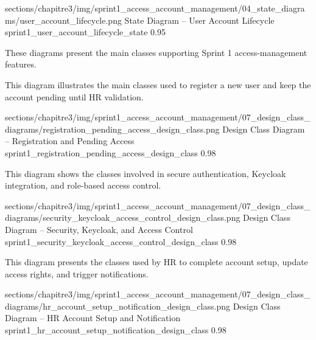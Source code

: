 \ChapterThreeFigureSized
{sections/chapitre3/img/sprint1_access_account_management/04_state_diagrams/user_account_lifecycle.png}
{State Diagram – User Account Lifecycle}
{sprint1_user_account_lifecycle_state}
{0.95}


{\fontsize{12}{18}\selectfont
\setlength{\parindent}{1.2cm}
\setlength{\parskip}{6pt}

\indent These diagrams present the main classes supporting Sprint 1 access-management features.
}

\Needspace{9.5cm}

\noindent This diagram illustrates the main classes used to register a new user and keep the account pending until HR validation.\par

\ChapterThreeFigureSized
{sections/chapitre3/img/sprint1_access_account_management/07_design_class_diagrams/registration_pending_access_design_class.png}
{Design Class Diagram – Registration and Pending Access}
{sprint1_registration_pending_access_design_class}
{0.98}

\Needspace{9.5cm}

\noindent This diagram shows the classes involved in secure authentication, Keycloak integration, and role-based access control.\par

\ChapterThreeFigureSized
{sections/chapitre3/img/sprint1_access_account_management/07_design_class_diagrams/security_keycloak_access_control_design_class.png}
{Design Class Diagram – Security, Keycloak, and Access Control}
{sprint1_security_keycloak_access_control_design_class}
{0.98}

\Needspace{9.5cm}

\noindent This diagram presents the classes used by HR to complete account setup, update access rights, and trigger notifications.\par

\ChapterThreeFigureSized
{sections/chapitre3/img/sprint1_access_account_management/07_design_class_diagrams/hr_account_setup_notification_design_class.png}
{Design Class Diagram – HR Account Setup and Notification}
{sprint1_hr_account_setup_notification_design_class}
{0.98}

